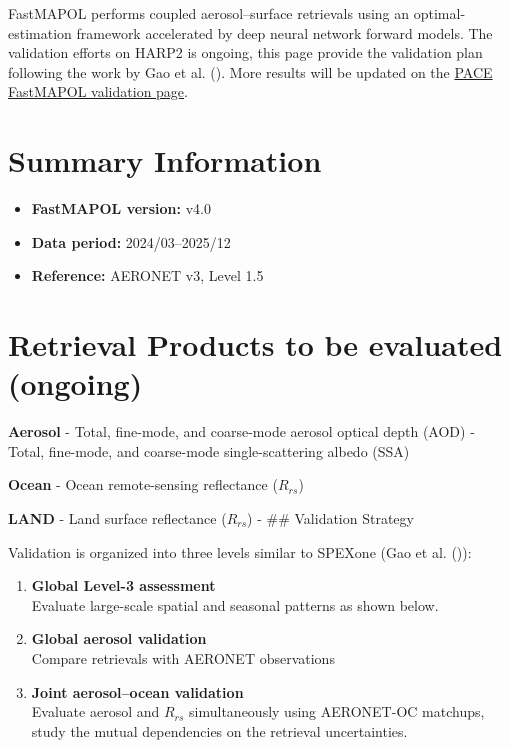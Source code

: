\documentclass[
  11pt,
  letterpaper,
]{scrreprt}
\providecommand{\tightlist}{%
  \setlength{\itemsep}{0pt}\setlength{\parskip}{0pt}}
\begin{document}
FastMAPOL performs coupled aerosol--surface retrievals using an
optimal-estimation framework accelerated by deep neural network forward
models. The validation efforts on HARP2 is ongoing, this page provide
the validation plan following the work by Gao et al.
(). More results will be updated on the
\href{https://pace.oceansciences.org/pace_fastmapol.htm}{PACE FastMAPOL
validation page}.

\section{Summary Information}\label{summary-information-2}

\begin{itemize}
\tightlist
\item
  \textbf{FastMAPOL version:} v4.0\\
\item
  \textbf{Data period:} 2024/03--2025/12\\
\item
  \textbf{Reference:} AERONET v3, Level 1.5
\end{itemize}

\section{Retrieval Products to be evaluated
(ongoing)}\label{retrieval-products-to-be-evaluated-ongoing}

\textbf{Aerosol} - Total, fine-mode, and coarse-mode aerosol optical
depth (AOD) - Total, fine-mode, and coarse-mode single-scattering albedo
(SSA)

\textbf{Ocean} - Ocean remote-sensing reflectance (\(R_{rs}\))

\textbf{LAND} - Land surface reflectance (\(R_{rs}\)) - \#\# Validation
Strategy

Validation is organized into three levels similar to SPEXone (Gao et al.
()):

\begin{enumerate}
\def\labelenumi{\arabic{enumi}.}
\item
  \textbf{Global Level-3 assessment}\\
  Evaluate large-scale spatial and seasonal patterns as shown below.
\item
  \textbf{Global aerosol validation}\\
  Compare retrievals with AERONET observations
\item
  \textbf{Joint aerosol--ocean validation}\\
  Evaluate aerosol and \(R_{rs}\) simultaneously using AERONET-OC
  matchups, study the mutual dependencies on the retrieval
  uncertainties.
\end{enumerate}
\end{document}
